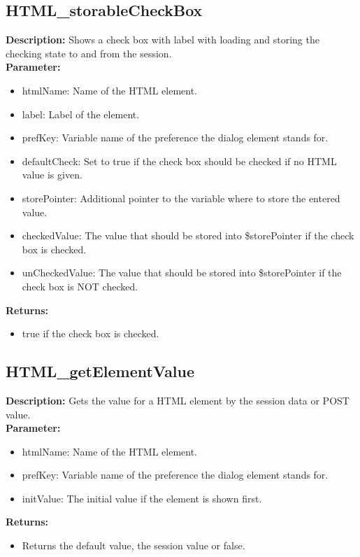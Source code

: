 \subsection{HTML\_storableCheckBox}
\textbf{Description:} Shows a check box with label with loading and storing the checking state to and from the session.\\
\textbf{Parameter:}
\begin{itemize}
\item htmlName: Name of the HTML element.
\item label: Label of the element.
\item prefKey: Variable name of the preference the dialog element stands for.
\item defaultCheck: Set to true if the check box should be checked if no HTML value is given.
\item storePointer: Additional pointer to the variable where to store the entered value.
\item checkedValue: The value that should be stored into \$storePointer if the check box is checked.
\item unCheckedValue: The value that should be stored into \$storePointer if the check box is NOT checked.
\end{itemize}
\textbf{Returns:}
\begin{itemize}
\item true if the check box is checked.
\end{itemize}

\subsection{HTML\_getElementValue}
\textbf{Description:} Gets the value for a HTML element by the session data or POST value.\\
\textbf{Parameter:}
\begin{itemize}
\item htmlName: Name of the HTML element.
\item prefKey: Variable name of the preference the dialog element stands for.
\item initValue: The initial value if the element is shown first.
\end{itemize}
\textbf{Returns:}
\begin{itemize}
\item Returns the default value, the session value or false.
\end{itemize}

